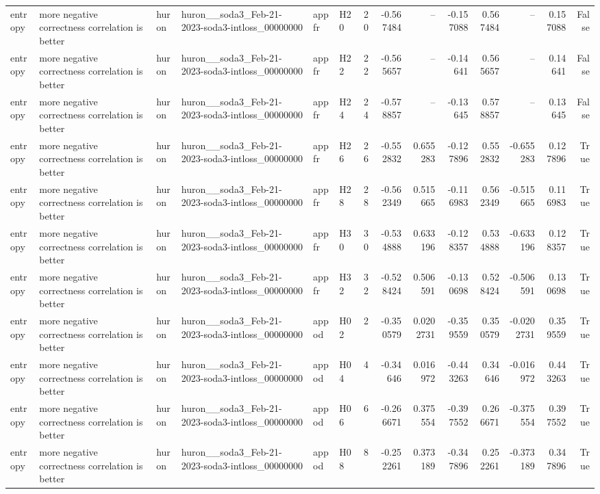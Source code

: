 \begin{longtable}{llllllrrrrrrrr}
entropy & more negative correctness correlation is better & huron & huron\_\_soda3\_Feb-21-2023-soda3-intloss\_00000000 & appfr & H20 & 20 & -0.567484 & -- & -0.157088 & 0.567484 & -- & 0.157088 & False \\
entropy & more negative correctness correlation is better & huron & huron\_\_soda3\_Feb-21-2023-soda3-intloss\_00000000 & appfr & H22 & 22 & -0.565657 & -- & -0.14641 & 0.565657 & -- & 0.14641 & False \\
entropy & more negative correctness correlation is better & huron & huron\_\_soda3\_Feb-21-2023-soda3-intloss\_00000000 & appfr & H24 & 24 & -0.578857 & -- & -0.13645 & 0.578857 & -- & 0.13645 & False \\
entropy & more negative correctness correlation is better & huron & huron\_\_soda3\_Feb-21-2023-soda3-intloss\_00000000 & appfr & H26 & 26 & -0.552832 & 0.655283 & -0.127896 & 0.552832 & -0.655283 & 0.127896 & True \\
entropy & more negative correctness correlation is better & huron & huron\_\_soda3\_Feb-21-2023-soda3-intloss\_00000000 & appfr & H28 & 28 & -0.562349 & 0.515665 & -0.116983 & 0.562349 & -0.515665 & 0.116983 & True \\
entropy & more negative correctness correlation is better & huron & huron\_\_soda3\_Feb-21-2023-soda3-intloss\_00000000 & appfr & H30 & 30 & -0.534888 & 0.633196 & -0.128357 & 0.534888 & -0.633196 & 0.128357 & True \\
entropy & more negative correctness correlation is better & huron & huron\_\_soda3\_Feb-21-2023-soda3-intloss\_00000000 & appfr & H32 & 32 & -0.528424 & 0.506591 & -0.130698 & 0.528424 & -0.506591 & 0.130698 & True \\
entropy & more negative correctness correlation is better & huron & huron\_\_soda3\_Feb-21-2023-soda3-intloss\_00000000 & appod & H02 & 2 & -0.350579 & 0.0202731 & -0.359559 & 0.350579 & -0.0202731 & 0.359559 & True \\
entropy & more negative correctness correlation is better & huron & huron\_\_soda3\_Feb-21-2023-soda3-intloss\_00000000 & appod & H04 & 4 & -0.34646 & 0.016972 & -0.443263 & 0.34646 & -0.016972 & 0.443263 & True \\
entropy & more negative correctness correlation is better & huron & huron\_\_soda3\_Feb-21-2023-soda3-intloss\_00000000 & appod & H06 & 6 & -0.266671 & 0.375554 & -0.397552 & 0.266671 & -0.375554 & 0.397552 & True \\
entropy & more negative correctness correlation is better & huron & huron\_\_soda3\_Feb-21-2023-soda3-intloss\_00000000 & appod & H08 & 8 & -0.252261 & 0.373189 & -0.347896 & 0.252261 & -0.373189 & 0.347896 & True \\

\end{longtable}
